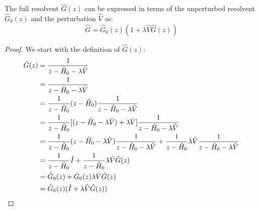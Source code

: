 \begin{proposition}
  The full resolvent $\hat G(z)$ can be expressed in terms of the
  unperturbed resolvent $\hat G_0(z)$ and the perturbation $\hat V$ as:
  \begin{equation} \label{eq:dyson_equation}
    \hat G=\hat G_0(z)(1+\lambda \hat V \hat G(z))
  \end{equation}
\end{proposition}
\begin{proof}
  We start with the definition of $\hat G(z)$:
  \begin{align} \label{eq:dyson_derivation}
    \hat G(z) &= \frac{1}{z - \hat H_0 - \lambda \hat V} \\
    &= \frac{1}{z - \hat H_0 - \lambda \hat V} \notag \\
    &= \frac{1}{z - \hat H_0} (z - \hat H_0) \frac{1}{z - \hat
    H_0 - \lambda \hat V} \notag \\
    &= \frac{1}{z - \hat H_0} [(z - \hat H_0 - \lambda \hat V) +
    \lambda \hat V] \frac{1}{z - \hat H_0 - \lambda \hat V} \notag \\
    &= \frac{1}{z - \hat H_0} (z - \hat H_0 - \lambda \hat V)
    \frac{1}{z - \hat H_0 - \lambda \hat V} + \frac{1}{z - \hat
    H_0} \lambda \hat V \frac{1}{z - \hat H_0 - \lambda \hat V} \notag \\
    &= \frac{1}{z - \hat H_0} \hat I + \frac{1}{z - \hat H_0}
    \lambda \hat V \hat G(z) \notag \\
    &= \hat G_0(z) + \hat G_0(z) \lambda \hat V \hat G(z) \notag \\
    &= \hat G_0(z) ( \hat I + \lambda \hat V \hat G(z) ) \notag
  \end{align}
\end{proof}

